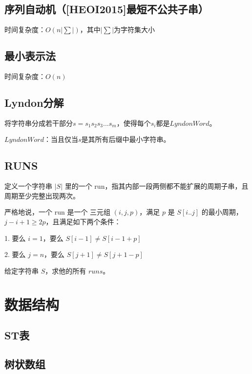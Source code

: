 \documentclass[twoside,a4paper]{article}
\begin{document}
\subsection{序列自动机（[HEOI2015]最短不公共子串）}
时间复杂度：$O(n|\sum|)$，其中$|\sum|$为字符集大小


\subsection{最小表示法}
时间复杂度：$O(n)$


\subsection{Lyndon分解}
将字符串分成若干部分$s = s_{1}s_{2}s_{3}...s_{m}$，使得每个$s_{i}$都是$Lyndon Word$。\par
$Lyndon Word$：当且仅当$s$是其所有后缀中最小字符串。


\subsection{RUNS}
定义一个字符串 $|S|$ 里的一个 run，指其内部一段两侧都不能扩展的周期子串，且周期至少完整出现两次。\par
严格地说，一个 run 是一个 三元组 $(i,j,p)$，满足 $p$ 是 $S[i..j]$ 的最小周期，$j-i+1 \ge 2p$，且满足如下两个条件：\par
1. 要么 $i=1$，要么 $S[i-1]\ne S[i-1+p]$\par
2. 要么 $j=n$，要么 $S[j+1] \ne S[j+1-p]$\par
给定字符串 $S$，求他的所有 $runs$。





\section{数据结构}

\subsection{ST表}



\subsection{树状数组}
\end{document}
